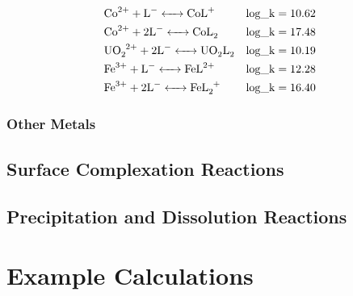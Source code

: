 \documentclass[12pt, a4paper]{article}
\begin{document}
\begin{align}
& \ce{Co^2+ + L^- <-> CoL^+} && \mathrm{log\_k} = 10.62 \\
& \ce{Co^2+ + 2 L^- <-> CoL_2} && \mathrm{log\_k} = 17.48 \\
& \ce{UO_2^2+ + 2 L^- <-> UO_2L_2} && \mathrm{log\_k} = 10.19 \\
& \ce{Fe^3+ + L^- <-> FeL^2+} && \mathrm{log\_k} = 12.28 \\
& \ce{Fe^3+ + 2 L^- <-> FeL_2^+} && \mathrm{log\_k} = 16.40
\end{align}

\subsubsection{Other Metals}
\subsection{Surface Complexation Reactions}
\subsection{Precipitation and Dissolution  Reactions}

\section{Example Calculations}
\end{document}
